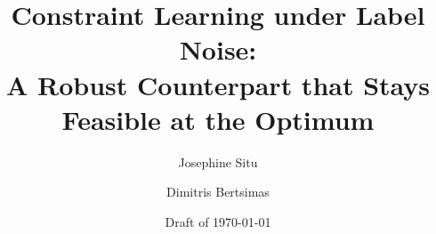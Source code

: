 %
\documentclass[11pt]{article}

\usepackage{amsmath,amssymb,amsthm}
\usepackage{booktabs}
\usepackage{graphicx}
\usepackage[margin=1in]{geometry}
\usepackage[authoryear,round]{natbib}
\usepackage{xcolor}
\usepackage[most]{tcolorbox}
\usepackage{enumitem}
\usepackage{hyperref}

\newtheorem{theorem}{Theorem}
\newtheorem{corollary}{Corollary}
\newtheorem{proposition}{Proposition}
\theoremstyle{definition}
\newtheorem{assumption}{Assumption}
\newtheorem{definition}{Definition}
\theoremstyle{remark}
\newtheorem{remark}{Remark}

\newcommand{\tbd}[1]{\textcolor{red!70!black}{[#1]}}
\newcommand{\status}[1]{\textcolor{blue!55!black}{\textup{\footnotesize[#1]}}}

\title{Constraint Learning under Label Noise:\\
A Robust Counterpart that Stays Feasible at the Optimum}
\author{Josephine Situ \and Dimitris Bertsimas}
\date{Draft of \today}


\maketitle

